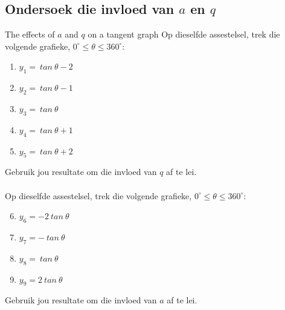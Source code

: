       

\subsection*{Ondersoek die invloed van $a$ en $q$}
\nopagebreak
\begin{Investigation}{The effects of $a$ and $q$ on a tangent graph}
Op dieselfde assestelsel, trek die volgende grafieke, $0^{\circ}\leq\theta\leq360^{\circ}$:
\begin{enumerate}[noitemsep, label=\textbf{\arabic*}. ] 
\item $y_1=~tan~\theta -2$
\item $y_2=~tan~\theta -1$
\item $y_3=~tan~\theta $
\item $y_4=~tan~\theta +1$
\item $y_5=~tan~\theta +2$
\end{enumerate}
Gebruik jou resultate om die invloed van $q$ af te lei.\\
\\
Op dieselfde assestelsel, trek die volgende grafieke, $0^{\circ}\leq\theta\leq360^{\circ}$:
\begin{enumerate}[noitemsep, label=\textbf{\arabic*}. ] \setcounter{enumi}{5}
\item $y_6=-2~tan~\theta $
\item $y_7=-~tan~\theta $
\item $y_8=~tan~\theta $
\item $y_9=2~tan~\theta $
\end{enumerate}
Gebruik jou resultate om die invloed van $a$ af te lei.
\end{Investigation}


